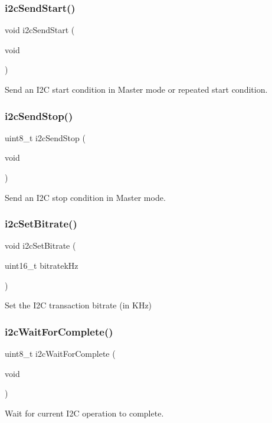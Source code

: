 \mbox{\label{twi__lib_8h_a95c4ba205513049cec14f6b6ece74e26}} 
\subsubsection{i2c\+Send\+Start()}
{\footnotesize\ttfamily void i2c\+Send\+Start (\begin{DoxyParamCaption}\item[{void}]{ }\end{DoxyParamCaption})}



Send an I2C start condition in Master mode or repeated start condition. 

\mbox{\label{twi__lib_8h_abd26726bed29632801d992d328e5e7e0}} 
\subsubsection{i2c\+Send\+Stop()}
{\footnotesize\ttfamily uint8\+\_\+t i2c\+Send\+Stop (\begin{DoxyParamCaption}\item[{void}]{ }\end{DoxyParamCaption})}



Send an I2C stop condition in Master mode. 

\mbox{\label{twi__lib_8h_ae3a41a077b9529ef656f38bb5a6ef494}} 
\subsubsection{i2c\+Set\+Bitrate()}
{\footnotesize\ttfamily void i2c\+Set\+Bitrate (\begin{DoxyParamCaption}\item[{uint16\+\_\+t}]{bitratek\+Hz }\end{DoxyParamCaption})}



Set the I2C transaction bitrate (in K\+Hz) 

\mbox{\label{twi__lib_8h_a1cb392a64f14da2002c7b09b1b8ddf33}} 
\subsubsection{i2c\+Wait\+For\+Complete()}
{\footnotesize\ttfamily uint8\+\_\+t i2c\+Wait\+For\+Complete (\begin{DoxyParamCaption}\item[{void}]{ }\end{DoxyParamCaption})}



Wait for current I2C operation to complete. 

